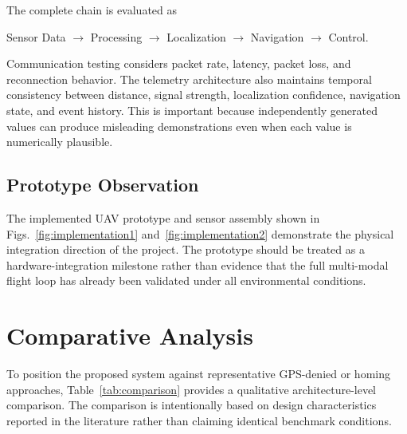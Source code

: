 \documentclass[conference]{IEEEtran}
\begin{document}
The complete chain is evaluated as

{\small
\begin{center}
Sensor Data $\rightarrow$ Processing $\rightarrow$ Localization
$\rightarrow$ Navigation $\rightarrow$ Control.
\end{center}
}

Communication testing considers packet rate, latency, packet loss, and
reconnection behavior. The telemetry architecture also maintains temporal
consistency between distance, signal strength, localization confidence,
navigation state, and event history. This is important because independently
generated values can produce misleading demonstrations even when each value is
numerically plausible.

\subsection{Prototype Observation}

The implemented UAV prototype and sensor assembly shown in
Figs.~\ref{fig:implementation1} and~\ref{fig:implementation2} demonstrate the
physical integration direction of the project. The prototype should be treated
as a hardware-integration milestone rather than evidence that the full
multi-modal flight loop has already been validated under all environmental
conditions.


\section{Comparative Analysis}

To position the proposed system against representative GPS-denied or homing
approaches, Table~\ref{tab:comparison} provides a qualitative
architecture-level comparison. The comparison is intentionally based on design
characteristics reported in the literature rather than claiming identical
benchmark conditions.
\end{document}
